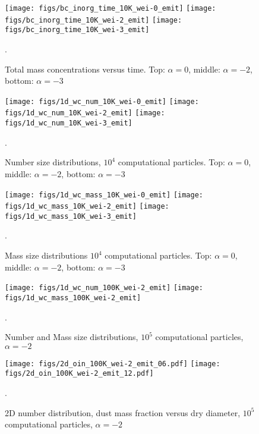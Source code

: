\documentclass{article}
\begin{document}
\begin{figure}
  \begin{center}
    \texttt{[image: figs/bc\_inorg\_time\_10K\_wei-0\_emit]}
    \texttt{[image: figs/bc\_inorg\_time\_10K\_wei-2\_emit]}
    \texttt{[image: figs/bc\_inorg\_time\_10K\_wei-3\_emit]}
  \end{center}
  \caption{\label{fig:bc_inorg_10K} Total mass concentrations versus
    time. Top: $\alpha = 0$, middle: $\alpha = -2$, bottom: $\alpha =
    -3$}.
\end{figure}

\begin{figure}
  \begin{center}
    \texttt{[image: figs/1d\_wc\_num\_10K\_wei-0\_emit]}
    \texttt{[image: figs/1d\_wc\_num\_10K\_wei-2\_emit]}
    \texttt{[image: figs/1d\_wc\_num\_10K\_wei-3\_emit]}
  \end{center}
  \caption{\label{fig:1d_wc_num_10K} Number size distributions, $10^4$
    computational particles. Top: $\alpha = 0$, middle: $\alpha = -2$,
    bottom: $\alpha = -3$}.
\end{figure}

\begin{figure}
  \begin{center}
    \texttt{[image: figs/1d\_wc\_mass\_10K\_wei-0\_emit]}
    \texttt{[image: figs/1d\_wc\_mass\_10K\_wei-2\_emit]}
    \texttt{[image: figs/1d\_wc\_mass\_10K\_wei-3\_emit]}
  \end{center}
  \caption{\label{fig:1d_wc_mass_10K} Mass size distributions $10^4$
    computational particles. Top: $\alpha = 0$, middle: $\alpha = -2$,
    bottom: $\alpha = -3$}.
\end{figure}

\begin{figure}
  \begin{center}
    \texttt{[image: figs/1d\_wc\_num\_100K\_wei-2\_emit]}
    \texttt{[image: figs/1d\_wc\_mass\_100K\_wei-2\_emit]}
  \end{center}
  \caption{\label{fig:1d_wc_100K} Number and Mass size distributions, $10^5$
    computational particles, $\alpha = -2$}.
\end{figure}

\begin{figure}
  \begin{center}
    \texttt{[image: figs/2d\_oin\_100K\_wei-2\_emit\_06.pdf]}
    \texttt{[image: figs/2d\_oin\_100K\_wei-2\_emit\_12.pdf]}
  \end{center}
  \caption{\label{fig:1d_wc_100K} 2D number distribution, dust mass
    fraction versus dry diameter, $10^5$ computational particles,
    $\alpha = -2$}.
\end{figure}
\end{document}
